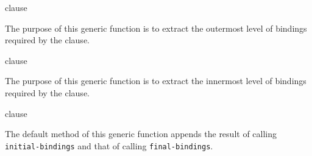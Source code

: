  {clause}

The purpose of this generic function is to extract the outermost level
of bindings required by the clause.

 {clause}

The purpose of this generic function is to extract the innermost level
of bindings required by the clause.

 {clause}

The default method of this generic function appends the result of
calling \texttt{initial-bindings} and that of calling
\texttt{final-bindings}.
